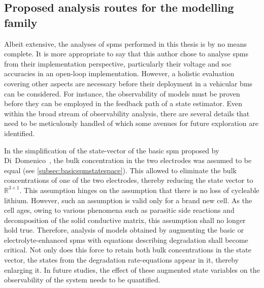 \subsection{Proposed analysis routes for the  modelling family}

Albeit extensive, the analyses of \glspl{spm}  performed in this thesis is by no
means complete. It is more appropriate to  say that this author chose to analyse
\glspl{spm} from  their implementation  perspective, particularly  their voltage
and \gls{soc}  accuracies in  an open-loop  implementation. However,  a holistic
evaluation covering  other aspects  are necessary before  their deployment  in a
vehicular \gls{bms} can be considered. For instance, the observability of models
must be  proven before  they can  be employed in  the feedback  path of  a state
estimator. Even  within the  broad stream of  observability analysis,  there are
several details that  need to be meticulously handled of  which some avenues for
future exploration are identified.

In the  simplification of the  state-vector of  the basic \gls{spm}  proposed by
Di~Domenico~\cite{DiDomenico2010}, the bulk concentration  in the two electrodes
was assumed to be equal  (see \cref{subsec:basicspmstatespace}). This allowed to
eliminate the bulk concentrations of one of the two electrodes, thereby reducing
the state  vector to~$\mathbb{R}^{3  \times 1}$. This  assumption hinges  on the
assumption  that  there is  no  loss  of  cycleable  lithium. However,  such  an
assumption  is valid  only for  a brand  new cell.  As the  cell ages,  owing to
various  phenomena such  as parasitic  side reactions  and decomposition  of the
solid conductive matrix,  this assumption shall no longer  hold true. Therefore,
analysis  of models  obtained by  augmenting the  basic or  electrolyte-enhanced
\glspl{spm}  with equations  describing degradation  shall become  critical. Not
only does this force to retain both bulk concentrations in the state vector, the
states from the  degradation rate-equations appear in it,  thereby enlarging it.
In  future  studies, the  effect  of  these  augmented  state variables  on  the
observability of the system needs to be quantified.

